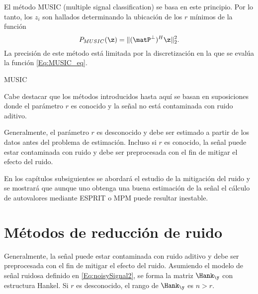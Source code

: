 	El método MUSIC (multiple signal classification) \cite{Schmidt1986} se basa en este principio. Por lo tanto, los $z_i$ son hallados determinando la ubicación de los $r$ mínimos de la función 
	\begin{equation} P_{MUSIC}(\z) = \|(\matP^{\perp})^H\z\|_2^2.\label{Eq:MUSIC_eq}\end{equation}
	La precisión de este método está limitada por la discretización en la que se evalúa la función \eqref{Eq:MUSIC_eq}. %


	\begin{algorithm}
		\caption{MUSIC}
		\begin{algorithmic}[1]
		\end{algorithmic}
		\label{Algorithm_music}
	\end{algorithm}	

	Cabe destacar que los métodos introducidos hasta aquí se basan en suposiciones donde el parámetro $r$ es conocido y la señal no está contaminada con ruido aditivo. 

	Generalmente, el parámetro $r$ es desconocido y debe ser estimado a partir de los datos antes del problema de estimación. Incluso si $r$ es conocido, la señal puede estar contaminada con ruido y debe ser preprocesada con el fin de mitigar el efecto del ruido. 

	En los capítulos subsiguientes se abordará el estudio de la mitigación del ruido y se mostrará que aunque uno obtenga una buena estimación de la señal el cálculo de autovalores mediante ESPRIT o MPM puede resultar inestable. %


	\section{Métodos de reducción de ruido}

	Generalmente, la señal puede estar contaminada con ruido aditivo y debe ser preprocesada con el fin de mitigar el efecto del ruido. Asumiendo el modelo de señal ruidosa definido en \eqref{Eq:noisySignal2}, se forma la matriz $\Hank_{\y}$ con estructura Hankel. Si $r$ es desconocido, el rango de $\Hank_{\y}$ es $n>r$.

